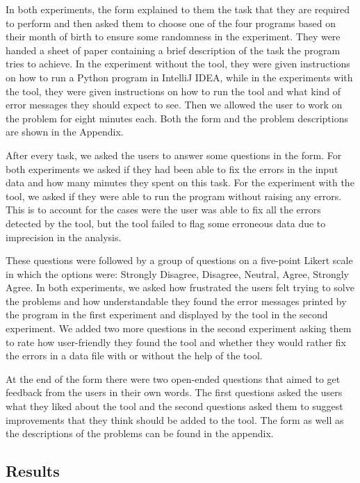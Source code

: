 \documentclass[10pt]{report}
\begin{document}
In both experiments, the form explained to them the task that they are required to perform and then asked them to choose one of the four programs based on their month of birth to ensure some randomness in the experiment. They were handed a sheet of paper containing a brief description of the task the program tries to achieve. In the experiment without the tool, they were given instructions on how to run a Python program in IntelliJ IDEA, while in the experiments with the tool, they were given instructions on how to run the tool and what kind of error messages they should expect to see. Then we allowed the user to work on the problem for eight minutes each. Both the form and the problem descriptions are shown in the Appendix. 

After every task, we asked the users to answer some questions in the form.  For both experiments we asked if they had been able to fix the errors in the input data and how many minutes they spent on this task. For the experiment with the tool, we asked if they were able to run the program without raising any errors. This is to account for the cases were the user was able to fix all the errors detected by the tool, but the tool failed to flag some erroneous data due to imprecision in the analysis.  

These questions were followed by a group of questions on a five-point Likert scale in which the options were: Strongly Disagree, Disagree, Neutral, Agree, Strongly Agree. In both experiments, we asked how frustrated the users felt trying to solve the problems and how understandable they found the error messages printed by the program in the first experiment and displayed by the tool in the second experiment. We added two more questions in the second experiment asking them to rate how user-friendly they found the tool and whether they would rather fix the errors in a data file with or without the help of the tool. 

At the end of the form there were two open-ended questions that aimed to get feedback from the users in their own words. The first questions asked the users what they liked about the tool and the second questions asked them to suggest improvements that they think should be added to the tool. The form as well as the descriptions of the problems can be found in the appendix. 

\subsection{Results} \label{results}
\end{document}
